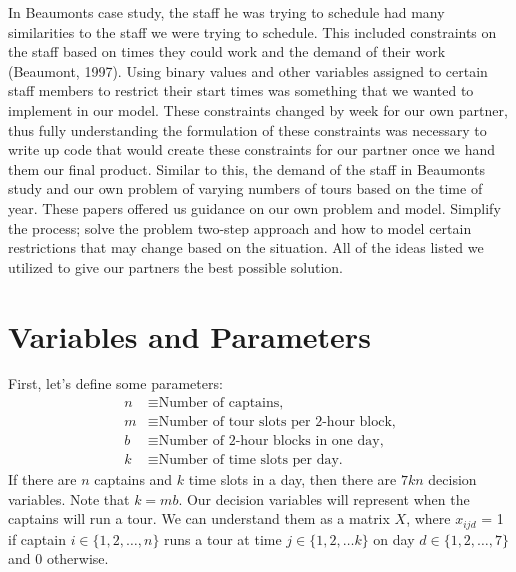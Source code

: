 \documentclass[12pt]{article}
\begin{document}
In Beaumonts case study, the staff he was trying to schedule had many similarities to the staff we were trying to schedule. This included constraints on the staff based on times they could work and the demand of their work (Beaumont, 1997). Using binary values and other variables assigned to certain staff members to restrict their start times was something that we wanted to implement in our model. These constraints changed by week for our own partner, thus fully understanding the formulation of these constraints was necessary to write up code that would create these constraints for our partner once we hand them our final product. Similar to this, the demand of the staff in Beaumonts study and our own problem of varying numbers of tours based on the time of year. These papers offered us guidance on our own problem and model. Simplify the process; solve the problem two-step approach and how to model certain restrictions that may change based on the situation. All of the ideas listed we utilized to give our partners the best possible solution. 
\section*{Variables and Parameters} First, let's define some parameters:
\begin{align*}
n &\equiv \text{Number of captains,}\\
m &\equiv \text{Number of tour slots per 2-hour block,}\\
b &\equiv \text{Number of 2-hour blocks in one day,}\\
k &\equiv \text{Number of time slots per day.}
\end{align*}
If there are $n$ captains and $k$ time slots in a day, then there are $7kn$ decision variables. Note that $k = mb$. Our decision variables will represent when the captains will run a tour. We can understand them as a matrix $X$, where $x_{ijd}$ = 1 if captain $i \in \{1, 2, \dots, n\}$ runs a tour at time $j \in \{1, 2, \dots k\}$ on day $d \in \{1, 2, \dots, 7\}$ and 0 otherwise.

\end{document}
